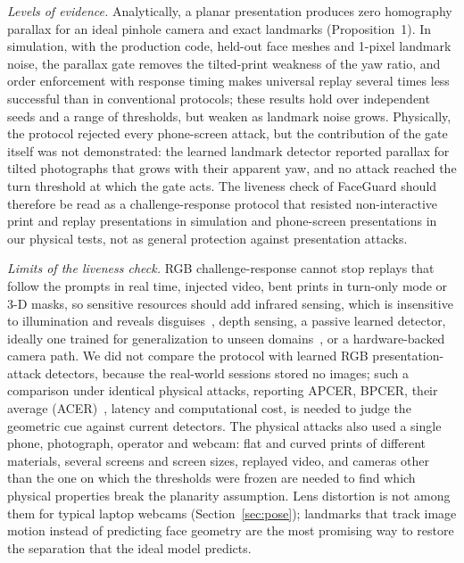 \documentclass{ieeeaccess}
\begin{document}
\emph{Levels of evidence.} Analytically, a planar presentation produces zero homography parallax for an ideal pinhole camera and exact landmarks (Proposition~1). In simulation, with the production code, held-out face meshes and 1-pixel landmark noise, the parallax gate removes the tilted-print weakness of the yaw ratio, and order enforcement with response timing makes universal replay several times less successful than in conventional protocols; these results hold over independent seeds and a range of thresholds, but weaken as landmark noise grows. Physically, the protocol rejected every phone-screen attack, but the contribution of the gate itself was not demonstrated: the learned landmark detector reported parallax for tilted photographs that grows with their apparent yaw, and no attack reached the turn threshold at which the gate acts. The liveness check of FaceGuard should therefore be read as a challenge-response protocol that resisted non-interactive print and replay presentations in simulation and phone-screen presentations in our physical tests, not as general protection against presentation attacks.

\emph{Limits of the liveness check.} RGB challenge-response cannot stop replays that follow the prompts in real time, injected video, bent prints in turn-only mode or 3-D masks, so sensitive resources should add infrared sensing, which is insensitive to illumination and reveals disguises~\cite{athira2018thermal}, depth sensing, a passive learned detector, ideally one trained for generalization to unseen domains~\cite{liu2018auxiliary,wang2022ssan}, or a hardware-backed camera path. We did not compare the protocol with learned RGB presentation-attack detectors, because the real-world sessions stored no images; such a comparison under identical physical attacks, reporting APCER, BPCER, their average (ACER)~\cite{iso30107-3}, latency and computational cost, is needed to judge the geometric cue against current detectors. The physical attacks also used a single phone, photograph, operator and webcam: flat and curved prints of different materials, several screens and screen sizes, replayed video, and cameras other than the one on which the thresholds were frozen are needed to find which physical properties break the planarity assumption. Lens distortion is not among them for typical laptop webcams (Section~\ref{sec:pose}); landmarks that track image motion instead of predicting face geometry are the most promising way to restore the separation that the ideal model predicts.
\end{document}
